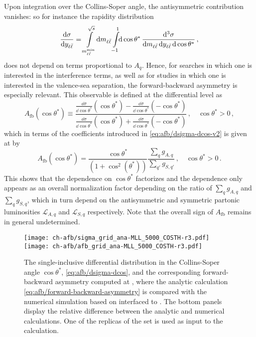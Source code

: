 Upon integration over the Collins-Soper angle, the
antisymmetric contribution vanishes: so for instance the
rapidity distribution
\begin{equation}
  \label{eq:afb/dsigma-dyll}
  \frac{\dd\sigma}{\dd y_{\ell\bar{\ell}}} = \int\limits_{m_{\ell\bar{\ell}}^{\text{min}}}^{\sqrt s}\!\dd m_{\ell\bar{\ell}} \int\limits_{-1}^{1}\!\!\dd\cos\theta^*\, \frac{\dd^3 \sigma}{\dd m_{\ell\bar{\ell}} \, \dd y_{\ell\bar{\ell}} \, \dd\cos\theta^*} \, ,
\end{equation}
does not depend on terms proportional to $A_q$.
%
Hence, for \bsm searches in which one is
interested in the interference terms, as well as for \pdf studies in which one is
interested in the valence-sea separation, the forward-backward
asymmetry is especially relevant.
%
This observable is
defined at the differential level as
\begin{equation}
  A_{\text{fb}}(\cos\theta^*) \equiv \frac{ \frac{\dd\sigma}{\dd\cos\theta^*}(\cos\theta^*)
  - \frac{\dd\sigma}{\dd\cos\theta^*}(-\cos\theta^*)}{ \frac{\dd\sigma}{\dd\cos\theta^*}(\cos\theta^*)
  + \frac{\dd\sigma}{\dd\cos\theta^*}(-\cos\theta^*) } \, ,\quad \cos\theta^*>0 \, ,
  \label{eq:afb/forward-backward-asymmetry}
\end{equation}
which in terms of the coefficients introduced in
\cref{eq:afb/dsigma-dcos-v2} is given at \lo by
\begin{equation}
  \label{eq:afb/afb_lo}
  A_{\text{fb}}(\cos\theta^*)   = \frac{\cos\theta^*}{(1+\cos^2(\theta^*))}\frac{\sum_q g_{A,q} }{\sum_{q'} g_{S,q'}} \, ,\quad \cos\theta^*>0 \,.
\end{equation}
This  shows that the dependence on $\cos\theta^*$ factorizes
and the \pdf dependence only appears as an overall normalization factor
depending on the ratio of $\sum_q g_{A,q}$
and $\sum_q g_{S,q}$, which in turn depend on the antisymmetric and symmetric
partonic luminosities $ \mathcal{L}_{A,q}$ and $ \mathcal{L}_{S,q}$ respectively.
%
Note that the overall sign of $A_{\text{fb}}$ remains in general undetermined.

\begin{figure}[t]
  \centering
  \texttt{[image: ch-afb/sigma\_grid\_ana-MLL\_5000\_COSTH-r3.pdf]}
  \texttt{[image: ch-afb/afb\_grid\_ana-MLL\_5000\_COSTH-r3.pdf]}
  \caption{The single-inclusive differential distribution in
    the Collins-Soper angle $\cos\theta^*$,
    \cref{eq:afb/dsigma-dcos},
    and the corresponding forward-backward asymmetry computed at \lo,
    where the analytic calculation  \cref{eq:afb/forward-backward-asymmetry}
    is compared with the numerical simulation based on 
    \mgamc
    interfaced to \pineappl.
    The bottom panels display the relative difference between the analytic and
    numerical calculations.
    One of the replicas of the  \nnlo \pdf set is used as input
    to the calculation.
  }    
  \label{fig:afb/lo-diff-cos}
\end{figure}

